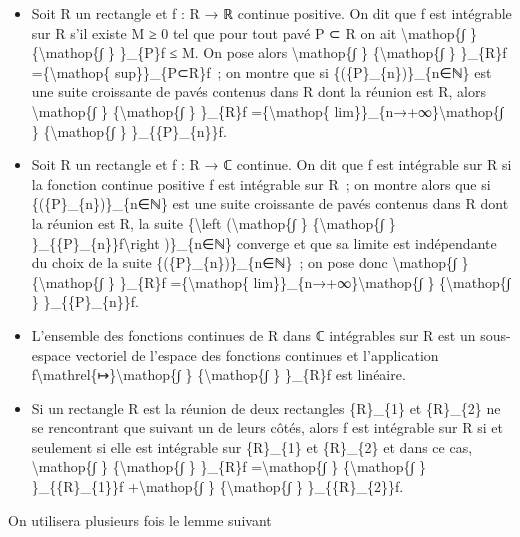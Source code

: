 \documentclass[]{article}
\begin{document}
\begin{itemize}
\itemsep1pt\parskip0pt
\item
  Soit R un rectangle et f : R → ℝ continue positive. On dit que f est
  intégrable sur R s'il existe M ≥ 0 tel que pour tout pavé P ⊂ R on ait
  \textbackslash{}mathop\{∫ \} \{\textbackslash{}mathop\{∫ \} \}\_\{P\}f
  ≤ M. On pose alors \textbackslash{}mathop\{∫ \}
  \{\textbackslash{}mathop\{∫ \} \}\_\{R\}f =\{\textbackslash{}mathop\{
  sup\}\}\_\{P⊂R\}f~; on montre que si \{(\{P\}\_\{n\})\}\_\{n∈ℕ\} est
  une suite croissante de pavés contenus dans R dont la réunion est R,
  alors \textbackslash{}mathop\{∫ \} \{\textbackslash{}mathop\{∫ \}
  \}\_\{R\}f =\{\textbackslash{}mathop\{
  lim\}\}\_\{n→+∞\}\textbackslash{}mathop\{∫ \}
  \{\textbackslash{}mathop\{∫ \} \}\_\{\{P\}\_\{n\}\}f.
\item
  Soit R un rectangle et f : R → ℂ continue. On dit que f est intégrable
  sur R si la fonction continue positive \textbar{}f\textbar{} est
  intégrable sur R~; on montre alors que si \{(\{P\}\_\{n\})\}\_\{n∈ℕ\}
  est une suite croissante de pavés contenus dans R dont la réunion est
  R, la suite \{\textbackslash{}left (\textbackslash{}mathop\{∫ \}
  \{\textbackslash{}mathop\{∫ \}
  \}\_\{\{P\}\_\{n\}\}f\textbackslash{}right )\}\_\{n∈ℕ\} converge et
  que sa limite est indépendante du choix de la suite
  \{(\{P\}\_\{n\})\}\_\{n∈ℕ\}~; on pose donc \textbackslash{}mathop\{∫
  \} \{\textbackslash{}mathop\{∫ \} \}\_\{R\}f
  =\{\textbackslash{}mathop\{ lim\}\}\_\{n→+∞\}\textbackslash{}mathop\{∫
  \} \{\textbackslash{}mathop\{∫ \} \}\_\{\{P\}\_\{n\}\}f.
\item
  L'ensemble des fonctions continues de R dans ℂ intégrables sur R est
  un sous-espace vectoriel de l'espace des fonctions continues et
  l'application f\textbackslash{}mathrel\{↦\}\textbackslash{}mathop\{∫
  \} \{\textbackslash{}mathop\{∫ \} \}\_\{R\}f est linéaire.
\item
  Si un rectangle R est la réunion de deux rectangles \{R\}\_\{1\} et
  \{R\}\_\{2\} ne se rencontrant que suivant un de leurs côtés, alors f
  est intégrable sur R si et seulement si elle est intégrable sur
  \{R\}\_\{1\} et \{R\}\_\{2\} et dans ce cas, \textbackslash{}mathop\{∫
  \} \{\textbackslash{}mathop\{∫ \} \}\_\{R\}f
  =\textbackslash{}mathop\{∫ \} \{\textbackslash{}mathop\{∫ \}
  \}\_\{\{R\}\_\{1\}\}f +\textbackslash{}mathop\{∫ \}
  \{\textbackslash{}mathop\{∫ \} \}\_\{\{R\}\_\{2\}\}f.
\end{itemize}

On utilisera plusieurs fois le lemme suivant
\end{document}
